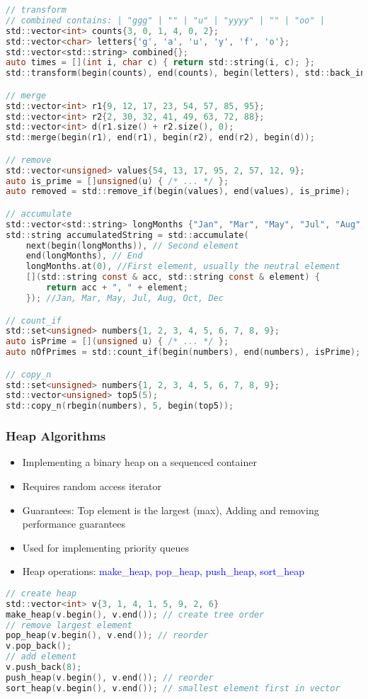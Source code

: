 \begin{lstlisting}[style=frame, style= linenumbers, language=C]
// transform
// combined contains: | "ggg" | "" | "u" | "yyyy" | "" | "oo" |
std::vector<int> counts{3, 0, 1, 4, 0, 2};
std::vector<char> letters{'g', 'a', 'u', 'y', 'f', 'o'};
std::vector<std::string> combined{};
auto times = [](int i, char c) { return std::string(i, c); };
std::transform(begin(counts), end(counts), begin(letters), std::back_inserter(combined), times);

// merge
std::vector<int> r1{9, 12, 17, 23, 54, 57, 85, 95};
std::vector<int> r2{2, 30, 32, 41, 49, 63, 72, 88};
std::vector<int> d(r1.size() + r2.size(), 0);
std::merge(begin(r1), end(r1), begin(r2), end(r2), begin(d));

// remove
std::vector<unsigned> values{54, 13, 17, 95, 2, 57, 12, 9};
auto is_prime = []unsigned(u) { /* ... */ };
auto removed = std::remove_if(begin(values), end(values), is_prime);

// accumulate
std::vector<std::string> longMonths {"Jan", "Mar", "May", "Jul", "Aug", "Oct", "Dec"};
std::string accumulatedString = std::accumulate(
    next(begin(longMonths)), // Second element
    end(longMonths), // End
    longMonths.at(0), //First element, usually the neutral element
    [](std::string const & acc, std::string const & element) {
        return acc + ", " + element;
    }); //Jan, Mar, May, Jul, Aug, Oct, Dec

// count_if
std::set<unsigned> numbers{1, 2, 3, 4, 5, 6, 7, 8, 9};
auto isPrime = [](unsigned u) { /* ... */ };
auto nOfPrimes = std::count_if(begin(numbers), end(numbers), isPrime);

// copy_n
std::set<unsigned> numbers{1, 2, 3, 4, 5, 6, 7, 8, 9};
std::vector<unsigned> top5(5);
std::copy_n(rbegin(numbers), 5, begin(top5));
\end{lstlisting}

\subsubsection{Heap Algorithms}
\begin{itemize}
    \item Implementing a binary heap on a sequenced container
    \item Requires random access iterator
    \item Guarantees: Top element is the largest (max), Adding and removing performance guarantees
    \item Used for implementing priority queues
    \item Heap operations: \textcolor{blue}{make\_heap, pop\_heap, push\_heap, sort\_heap}
\end{itemize}
\begin{lstlisting}[style=frame, style= linenumbers, language=C]
// create heap
std::vector<int> v{3, 1, 4, 1, 5, 9, 2, 6}
make_heap(v.begin(), v.end()); // create tree order
// remove largest element
pop_heap(v.begin(), v.end()); // reorder
v.pop_back();
// add element
v.push_back(8);
push_heap(v.begin(), v.end()); // reorder
sort_heap(v.begin(), v.end()); // smallest element first in vector
\end{lstlisting}
